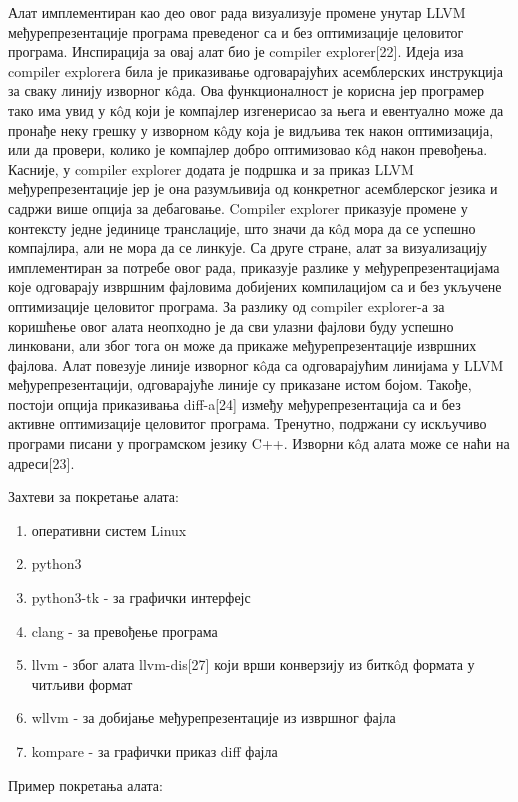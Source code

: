 \documentclass[12pt,oneside]{memoir}
\begin{document}
Алат имплементиран као део овог рада визуализује
промене унутар LLVM међурепрезентације програма 
преведеног са и без оптимизације целовитог програма.
Инспирација за овај алат био је compiler explorer[22].
Идеја иза compiler explorerа била је приказивање одговарајућих асемблерских
инструкција за сваку линију изворног к\^{o}да.
Ова функционалност је корисна јер програмер тако има увид у к\^{o}д који је 
компајлер изгенерисао за њега и евентуално може да пронађе неку грешку у 
изворном к\^{o}ду која је видљива тек након оптимизација, или да провери, колико је компајлер добро оптимизовао к\^{o}д након превођења.
Касније, у compiler explorer додата је подршка и за приказ LLVM међурепрезентације
јер је она разумљивија од конкретног асемблерског језика и садржи више опција
за дебаговање.
Compiler explorer приказује промене у контексту једне јединице транслације,
 што значи да к\^{o}д мора да се успешно компајлира, али не мора да се линкује. 
Са друге стране, алат за визуализацију имплементиран за потребе овог рада,
приказује разлике у међурепрезентацијама које одговарају извршним фајловима добијених
компилацијом 
са и без укључене оптимизације целовитог програма.
За разлику од compiler explorer-а за коришћење овог алата неопходно је да сви
улазни фајлови буду успешно линковани, али због тога он може да прикаже 
међурепрезентације извршних фајлова.
Алат повезује линије изворног к\^{o}да са одговарајућим линијама у LLVM 
међурепрезентацији, одговарајуће линије су приказане истом бојом.
Такође, постоји опција приказивања diff-a[24] између међурепрезентација са и без
активне оптимизације целовитог програма.
Тренутно, подржани су искључиво програми писани у програмском језику C++.
Изворни  к\^{o}д алата може се наћи на адреси[23].

Захтеви за покретање алата:
\begin{enumerate}
\item оперативни систем Linux
\item python3
\item python3-tk - за графички интерфејс
\item clang - за превођење програма
\item llvm - због алата llvm-dis[27] који врши конверзију из битк\^{o}д формата у
			читљиви формат
\item wllvm - за добијање међурепрезентације из извршног фајла
\item kompare - за графички приказ diff фајла
\end{enumerate}

Пример покретања алата:
\end{document}
